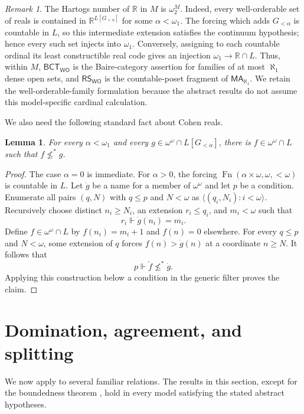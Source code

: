 \documentclass[11pt,reqno]{amsart}
\newcommand{\R}{\mathbb R}
\newcommand{\WO}{\mathsf{WO}}
\newcommand{\Fn}{\operatorname{Fn}}
\newcommand{\BCTWO}{\mathsf{BCT}_{\WO}}
\newcommand{\RSWO}{\mathsf{RS}_{\WO}}
\theoremstyle{plain}
\newtheorem{lemma}[lemma]{Lemma}
\theoremstyle{definition}
\theoremstyle{remark}
\newtheorem{remark}[remark]{Remark}
\begin{document}
\begin{remark}\label{rem:model-hartogs}
The Hartogs number of $\R$ in $M$ is $\omega_2^M$.  Indeed, every
well-orderable set of reals is contained in $\R^{L[G_{<\alpha}]}$ for some
$\alpha<\omega_1$.  The forcing which adds $G_{<\alpha}$ is countable in
$L$, so this intermediate extension satisfies the continuum hypothesis;
hence every such set injects into $\omega_1$.  Conversely, assigning to each
countable ordinal its least constructible real code gives an injection
$\omega_1\to\R\cap L$.  Thus, within $M$, $\BCTWO$ is the Baire-category
assertion for families of at most $\aleph_1$ dense open sets, and $\RSWO$ is
the countable-poset fragment of $\mathsf{MA}_{\aleph_1}$.  We retain the
well-orderable-family formulation because the abstract results do not assume
this model-specific cardinal calculation.
\end{remark}

We also need the following standard fact about Cohen reals.

\begin{lemma}\label{lem:no-dominating-real}
For every $\alpha<\omega_1$ and every
$g\in\omega^\omega\cap L[G_{<\alpha}]$, there is
$f\in\omega^\omega\cap L$ such that $f\not\leq^*g$.
\end{lemma}

\begin{proof}
The case $\alpha=0$ is immediate.  For $\alpha>0$, the forcing
$\Fn(\alpha\times\omega,\omega,{<}\omega)$ is countable in $L$.  Let
$\dot g$ be a name for a member of $\omega^\omega$ and let $p$ be a
condition.  Enumerate all pairs $(q,N)$ with $q\leq p$ and $N<\omega$ as
$\langle(q_i,N_i):i<\omega\rangle$.  Recursively choose distinct
$n_i\geq N_i$, an extension $r_i\leq q_i$, and $m_i<\omega$ such that
\[
 r_i\Vdash\dot g(n_i)=m_i.
\]
Define $f\in\omega^\omega\cap L$ by $f(n_i)=m_i+1$ and $f(n)=0$ elsewhere.
For every $q\leq p$ and $N<\omega$, some extension of $q$ forces
$f(n)>\dot g(n)$ at a coordinate $n\geq N$.  It follows that
\[
 p\Vdash\check f\not\leq^*\dot g.
\]
Applying this construction below a condition in the generic filter proves the
claim.
\end{proof}

\section{Domination, agreement, and splitting}\label{sec:diagonal}

We now apply  to several familiar relations.  The
results in this section, except for the boundedness theorem
, hold in every model satisfying the stated
abstract hypotheses.
\end{document}
